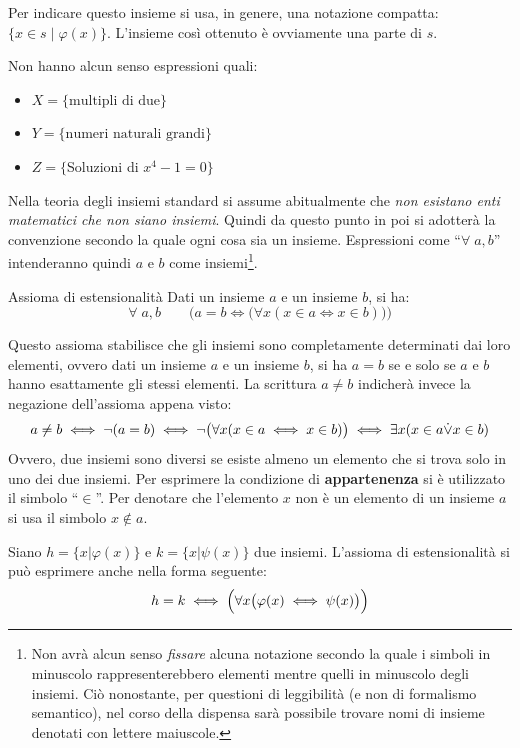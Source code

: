 Per indicare questo insieme si usa, in genere, una notazione compatta: $\{x \in s  \; | \; \varphi(x)\}$. L'insieme così ottenuto è ovviamente una parte di $s$.
\begin{example}
	Non hanno alcun senso espressioni quali:
	\begin{itemize}
		\item $X=\{\text{multipli di due}\}$
		\item $Y=\{\text{numeri naturali grandi}\}$
		\item $Z=\{$Soluzioni di $x^{4}-1=0 \}$
	\end{itemize}
\end{example}

Nella teoria degli insiemi standard si assume abitualmente che \emph{non esistano enti matematici che non siano insiemi}. Quindi da questo punto in poi si adotterà la convenzione secondo la quale ogni cosa sia un insieme. Espressioni come ``$\forall \; a,b$'' intenderanno quindi $a$ e $b$ come insiemi\footnote{Non avrà alcun senso \emph{fissare} alcuna notazione secondo la quale i simboli in minuscolo rappresenterebbero elementi mentre quelli in minuscolo degli insiemi. Ciò nonostante, per questioni di leggibilità (e non di formalismo semantico), nel corso della dispensa sarà possibile trovare nomi di insieme denotati con lettere maiuscole.}.

\begin{axiombox}{Assioma di estensionalità}\label{axiom:extensionality}
	Dati un insieme $a$ e un insieme $b$, si ha:
	\begin{equation}
		\forall \; a,b \qquad
		\biggl(a=b \iff \bigl(\forall x (x \in a \iff x \in b)\bigr)\biggr)
	\end{equation}
\end{axiombox}

Questo assioma stabilisce che gli insiemi sono completamente determinati dai loro elementi, ovvero dati un insieme $a$ e un insieme $b$, si ha $a=b$ se e solo se $a$ e $b$ hanno esattamente gli stessi elementi. La scrittura $a \neq b$ indicherà invece la negazione dell'assioma appena visto:
\begin{displaymath}
	a \neq b \iff \neg(a = b) \iff \neg \bigl( \forall x (x \in a \iff x \in b) \bigr) \iff \exists x (x \in a {\displaystyle{\dot{\vee}}} x \in b)
\end{displaymath}
Ovvero, due insiemi sono diversi se esiste almeno un elemento che si trova solo in uno dei due insiemi. Per esprimere la condizione di \textbf{appartenenza} si è utilizzato il simbolo ``$\in$''. Per denotare che l'elemento $x$ non è un elemento di un insieme $a$ si usa il simbolo $x \notin a$.
\begin{lemmabox}
	Siano $h=\{x|\varphi(x)\}$ e $k=\{x|\psi(x)\}$ due insiemi. L'assioma di estensionalità si può esprimere anche nella forma seguente:
	\begin{equation}
		h = k \iff \Bigl(  \forall x \bigl( \varphi(x) \iff \psi(x) \bigr)\Bigr)
	\end{equation}
\end{lemmabox}


